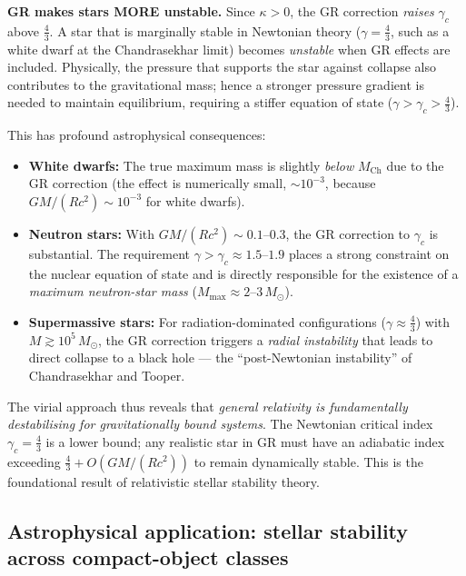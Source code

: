 \begin{relcorrection}
\textbf{GR makes stars MORE unstable.}
Since $\kappa > 0$, the GR correction \emph{raises}
$\gamma_{c}$ above $\tfrac{4}{3}$.  A star that is marginally stable
in Newtonian theory ($\gamma = \tfrac{4}{3}$, such as a white dwarf
at the Chandrasekhar limit) becomes \emph{unstable} when GR effects
are included.  Physically, the pressure that supports the star against
collapse also contributes to the gravitational mass; hence a stronger
pressure gradient is needed to maintain equilibrium, requiring a
stiffer equation of state ($\gamma > \gamma_{c} > \tfrac{4}{3}$).

This has profound astrophysical consequences:
\begin{itemize}
\item \textbf{White dwarfs:} The true maximum mass is slightly
  \emph{below} $M_{\mathrm{Ch}}$ due to the GR correction
  (the effect is numerically small, $\sim 10^{-3}$, because
  $GM/(Rc^{2}) \sim 10^{-3}$ for white dwarfs).
\item \textbf{Neutron stars:} With $GM/(Rc^{2}) \sim 0.1$--$0.3$, the
  GR correction to $\gamma_{c}$ is substantial.  The requirement
  $\gamma > \gamma_{c} \approx 1.5$--$1.9$ places a strong constraint
  on the nuclear equation of state and is directly responsible for the
  existence of a \emph{maximum neutron-star mass}
  ($M_{\max} \approx 2$--$3\,M_{\odot}$).
\item \textbf{Supermassive stars:} For radiation-dominated
  configurations ($\gamma \approx \tfrac{4}{3}$) with
  $M \gtrsim 10^{5}\,M_{\odot}$, the GR correction triggers a
  \emph{radial instability} that leads to direct collapse to a black
  hole --- the ``post-Newtonian instability'' of Chandrasekhar and
  Tooper.
\end{itemize}
\end{relcorrection}

The virial approach thus reveals that \emph{general relativity is
fundamentally destabilising for gravitationally bound systems}.  The
Newtonian critical index $\gamma_{c}=\tfrac{4}{3}$ is a lower bound;
any realistic star in GR must have an adiabatic index exceeding
$\tfrac{4}{3} + O(GM/(Rc^{2}))$ to remain dynamically stable.  This
is the foundational result of relativistic stellar stability theory.

\subsection{Astrophysical application: stellar stability across
  compact-object classes}
\label{sec:rel-118-astro}


